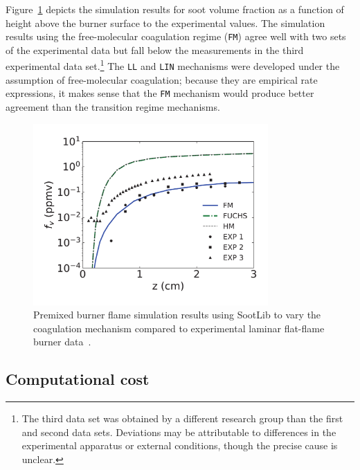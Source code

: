 \documentclass[preprint,letterpaper]{elsarticle}
\begin{document}
Figure~\ref{f:soot-premix} depicts the simulation results for soot volume fraction as a function of height above the burner surface to the experimental values. The simulation results using the free-molecular coagulation regime (\texttt{FM}) agree well with two sets of the experimental data but fall below the measurements in the third experimental data set.\footnote{The third data set was obtained by a different research group than the first and second data sets. Deviations may be attributable to differences in the experimental apparatus or external conditions, though the precise cause is unclear.}
The \texttt{LL} and \texttt{LIN} mechanisms were developed under the assumption of free-molecular coagulation; because they are empirical rate expressions, it makes sense that the \texttt{FM} mechanism would produce better agreement than the transition regime mechanisms.
%
\begin{figure}
    \begin{center}
        \includegraphics[width=0.8\textwidth]{../figures/burner_COMPARE}
    \end{center}
    \caption{Premixed burner flame simulation results using SootLib to vary the coagulation mechanism compared to experimental laminar flat-flame burner data~\cite{Xu_1997,Menon_2007}.}
    \label{f:soot-premix}
\end{figure}
%

\subsection{Computational cost}
\label{s:soot-examples-compcost}
\end{document}
